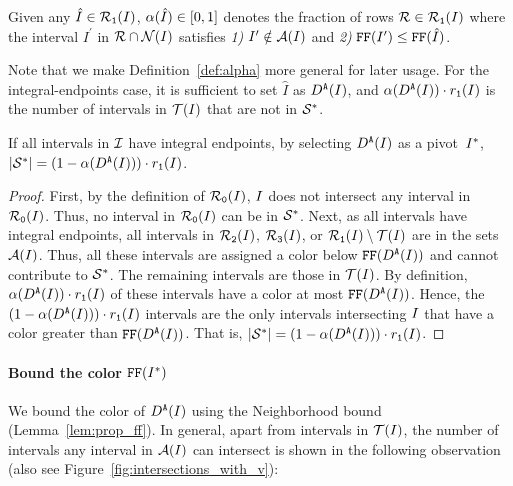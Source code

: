 \begin{definition}
    \label{def:alpha}
    Given any $\hat{I} \in \mathcal{R}_\texttt{1}(I)$, $\alpha(\hat{I}) \in [0,1]$ denotes the fraction of rows $\mathcal{R} \in \mathcal{R}_\texttt{1}(I)$ where the interval $I^\prime$ in $\mathcal{R} \cap \mathcal{N}(I)$ satisfies \emph{1)} $I^\prime \notin \mathcal{A}(I)$ and \emph{2)} $\text{\texttt{FF}}(I^\prime) \leq \text{\texttt{FF}}(\hat{I})$.
\end{definition}

Note that we make Definition~\ref{def:alpha} more general for later usage. 
For the integral-endpoints case, it is sufficient to set $\hat{I}$ as $D^\texttt{A}(I)$, and $\alpha(D^\texttt{A}(I)) \cdot r_\texttt{1}(I)$ is the number of intervals in $\mathcal{T}(I)$ that are not in $\mathcal{S}^*$.

\begin{lemma}
    \label{lem:integral_S}
    If all intervals in $\mathcal{I}$ have integral endpoints, by selecting $D^\texttt{A}(I)$ as a pivot~$I^*$, $|\mathcal{S}^*| = (1-\alpha(D^\texttt{A}(I))) \cdot r_\texttt{1}(I)$.
\end{lemma}

\begin{proof}
    First, by the definition of $\mathcal{R}_\texttt{0}(I)$, $I$ does not intersect any interval in $\mathcal{R}_\texttt{0}(I)$. Thus, no interval in $\mathcal{R}_\texttt{0}(I)$ can be in $\mathcal{S}^*$.
    Next, as all intervals have integral endpoints, all intervals in $\mathcal{R}_\texttt{2}(I)$, $\mathcal{R}_\texttt{3}(I)$, or $\mathcal{R}_\texttt{1}(I) \setminus \mathcal{T}(I)$ are in the sets $\mathcal{A}(I)$.
    Thus, all these intervals are assigned a color below $\text{\texttt{FF}}(D^\texttt{A}(I))$ and cannot contribute to $\mathcal{S}^*$.
    The remaining intervals are those in $\mathcal{T}(I)$.
    By definition, $\alpha(D^\texttt{A}(I)) \cdot r_\texttt{1}(I)$ of these intervals have a color at most $\text{\texttt{FF}}(D^\texttt{A}(I))$.
    Hence, the $(1 - \alpha(D^\texttt{A}(I))) \cdot r_\texttt{1}(I)$ intervals are the only intervals intersecting $I$ that have a color greater than $\text{\texttt{FF}}(D^\texttt{A}(I))$.
    That is, $|\mathcal{S}^*| = (1 - \alpha(D^\texttt{A}(I))) \cdot r_\texttt{1}(I)$.
\end{proof}


\paragraph*{Bound the color $\text{\texttt{FF}}(I^*)$}

We bound the color of $D^\texttt{A}(I)$ using the Neighborhood bound (Lemma~\ref{lem:prop_ff}).
In general, apart from intervals in $\mathcal{T}(I)$, the number of intervals any interval in $\mathcal{A}(I)$ can intersect is shown in the following observation (also see Figure~\ref{fig:intersections_with_v}):

